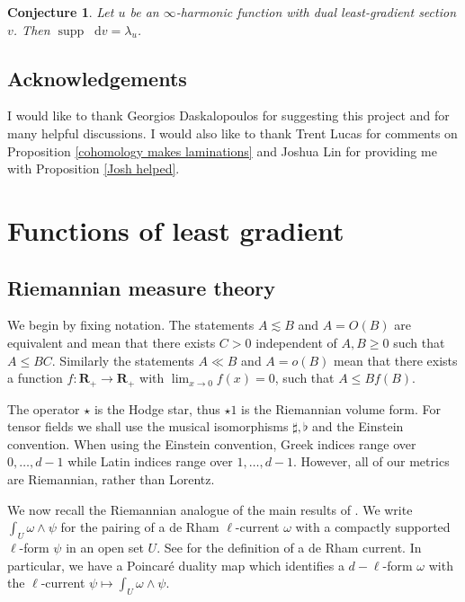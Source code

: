 \documentclass[reqno,12pt,letterpaper]{amsart}
\newcommand{\RR}{\mathbf{R}}
\DeclareMathOperator{\supp}{supp}
\newcommand*\dif{\mathop{}\!\mathrm{d}}
\newtheorem{conjecture}[theorem]{Conjecture}
\theoremstyle{definition}
\numberwithin{equation}{section}
\begin{document}
\begin{conjecture}\label{two laminations agree}
Let $u$ be an $\infty$-harmonic function with dual least-gradient section $v$.
Then $\supp \dif v = \lambda_u$.
\end{conjecture}



\subsection{Acknowledgements}
I would like to thank Georgios Daskalopoulos for suggesting this project and for many helpful discussions.
I would also like to thank Trent Lucas for comments on Proposition \ref{cohomology makes laminations} and Joshua Lin for providing me with Proposition \ref{Josh helped}.




\section{Functions of least gradient}\label{LeastGradientFunctions}
\subsection{Riemannian measure theory}
We begin by fixing notation.
The statements $A \lesssim B$ and $A = O(B)$ are equivalent and mean that there exists $C > 0$ independent of $A, B \geq 0$ such that $A \leq BC$.
Similarly the statements $A \ll B$ and $A = o(B)$ mean that there exists a function $f: \RR_+ \to \RR_+$ with $\lim_{x \to 0} f(x) = 0$, such that $A \leq Bf(B)$.

The operator $\star$ is the Hodge star, thus $\star 1$ is the Riemannian volume form.
For tensor fields we shall use the musical isomorphisms $\sharp, \flat$ and the Einstein convention.
When using the Einstein convention, Greek indices range over $0, \dots, d - 1$ while Latin indices range over $1, \dots, d - 1$.
However, all of our metrics are Riemannian, rather than Lorentz.

We now recall the Riemannian analogue of the main results of \cite[Chapter 1]{Giusti77}.
We write $\int_U \omega \wedge \psi$ for the pairing of a de Rham $\ell$-current $\omega$ with a compactly supported $\ell$-form $\psi$ in an open set $U$. See \cite{simon1983GMT} for the definition of a de Rham current.
In particular, we have a Poincar\'e duality map which identifies a $d - \ell$-form $\omega$ with the $\ell$-current $\psi \mapsto \int_U \omega \wedge \psi$.
\end{document}
